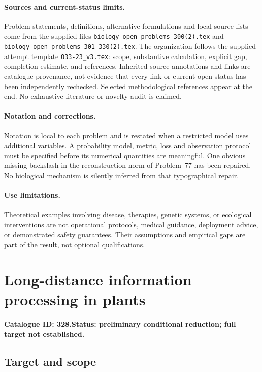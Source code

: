 \documentclass[11pt]{article}
\begin{document}
\paragraph{Sources and current-status limits.}
Problem statements, definitions, alternative formulations and local source lists
come from the supplied files
\texttt{biology\_open\_problems\_300(2).tex} and
\texttt{biology\_open\_problems\_301\_330(2).tex}.
The organization follows the supplied attempt template
\texttt{O33-23\_v3.tex}: scope, substantive calculation, explicit gap,
completion estimate, and references. Inherited source annotations and links are
catalogue provenance, not evidence that every link or current open status has
been independently rechecked. Selected methodological references appear at the
end. No exhaustive literature or novelty audit is claimed.

\paragraph{Notation and corrections.}
Notation is local to each problem and is restated when a restricted model uses
additional variables. A probability model, metric, loss and observation protocol
must be specified before its numerical quantities are meaningful. One obvious
missing backslash in the reconstruction norm of Problem~77 has been repaired.
No biological mechanism is silently inferred from that typographical repair.

\paragraph{Use limitations.}
Theoretical examples involving disease, therapies, genetic systems, or ecological
interventions are not operational protocols, medical guidance, deployment advice,
or demonstrated safety guarantees. Their assumptions and empirical gaps are part
of the result, not optional qualifications.

\setcounter{section}{327}
\section{Long-distance information processing in plants}
\label{prob:328}
\noindent\textbf{Catalogue ID: 328.}\quad \textbf{Status: preliminary conditional reduction; full target not established.}
\subsection{Target and scope}
\end{document}
